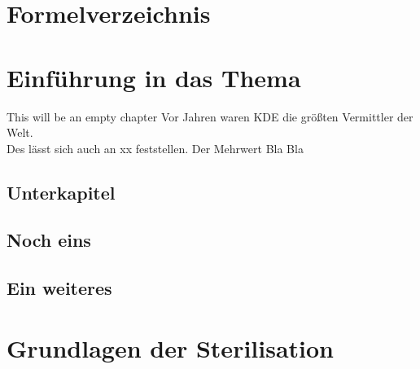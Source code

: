 \documentclass[
    12pt, %
    ngerman, %
    a4paper, %
    oneside, %
    headings=big, %
    nolistof=totoc, %
    nobibliography=totoc, %
    index=totoc, %
    captions=tableheading, %
    final %
    sectionentrydots=true,
    toc = bibliography
]{scrreprt}
\begin{document}
\vspace{2cm}

\opensymdef{}


\closesymdef{}


\renewcommand{\symheadingname}{Symbolverzeichnis}
\cleardoublepage{}
\listofsymbols{}


\vspace{2cm}

\cleardoublepage{}
\chapter*{Formelverzeichnis} 
\renewcommand{\listtablename}{Formel}



\newpage


\chapter{Einführung in das Thema}



This will be an empty chapter
Vor Jahren waren \ac{KDE} die größten Vermittler der Welt. \\
Des lässt sich auch an xx feststellen. Der Mehrwert Bla Bla \blindtext\par


\blindtext{}

\section{Unterkapitel}
\blindtext{}
\section{Noch eins}
\section{Ein weiteres}

\newpage

\chapter{Grundlagen der Sterilisation}
\blindtext[1]
\end{document}

